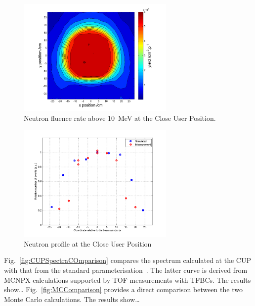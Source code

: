 \documentclass[11pt,a4paper]{IEEEtran}
\let\MYoriglatexcaption\caption
\renewcommand{\caption}[2][\relax]{\MYoriglatexcaption[#2]{#2}}
\begin{document}
\begin{figure}[t]
    \vspace{2in}
    \includegraphics[width=3in]{CUP10ColSpatialDistribution10MeV.png}
    \caption{Neutron fluence rate above \SI{10}{\MeV} at the Close User Position.}
    \label{fig:CUPDensity}
\end{figure}

\begin{figure}[t]
    \vspace{2in}
    \includegraphics[width=3in]{CUPTOF10beamproRADECS.png}
    \caption{Neutron profile at the Close User Position}
    \label{fig:CUPProfile}
\end{figure}

Fig.~\ref{fig:CUPSpectraCOmparison} compares the spectrum calculated at the CUP with that from the standard parameterisation~\cite{Prokofiev14}.
The latter curve is derived from MCNPX calculations supported by TOF measurements with TFBCs.
The results show\ldots{}
Fig.~\ref{fig:MCComparison} provides a direct comparison between the two Monte Carlo calculations.
The results show\ldots{}
\end{document}
